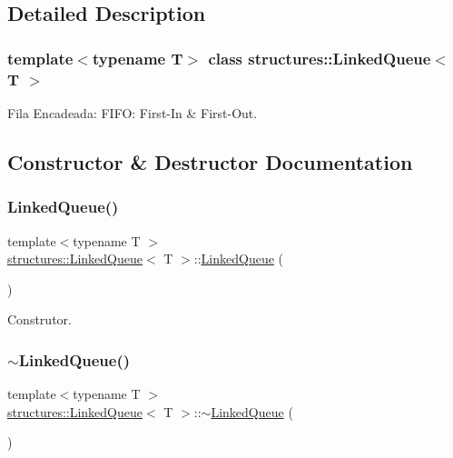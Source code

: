 \subsection{Detailed Description}
\subsubsection*{template$<$typename T$>$\newline
class structures\+::\+Linked\+Queue$<$ T $>$}

Fila Encadeada\+: F\+I\+FO\+: First-\/\+In \& First-\/\+Out. 

\subsection{Constructor \& Destructor Documentation}
\mbox{\label{classstructures_1_1LinkedQueue_aae2a207f04610f5bb460de8b4f5c7650}} 
\subsubsection{\texorpdfstring{Linked\+Queue()}{LinkedQueue()}}
{\footnotesize\ttfamily template$<$typename T $>$ \\
\hyperlink{classstructures_1_1LinkedQueue}{structures\+::\+Linked\+Queue}$<$ T $>$\+::\hyperlink{classstructures_1_1LinkedQueue}{Linked\+Queue} (\begin{DoxyParamCaption}{ }\end{DoxyParamCaption})}



Construtor. 

\mbox{\label{classstructures_1_1LinkedQueue_ad3f70a9465ecbf8868ad9206e2b01711}} 
\subsubsection{\texorpdfstring{$\sim$\+Linked\+Queue()}{~LinkedQueue()}}
{\footnotesize\ttfamily template$<$typename T $>$ \\
\hyperlink{classstructures_1_1LinkedQueue}{structures\+::\+Linked\+Queue}$<$ T $>$\+::$\sim$\hyperlink{classstructures_1_1LinkedQueue}{Linked\+Queue} (\begin{DoxyParamCaption}{ }\end{DoxyParamCaption})}



